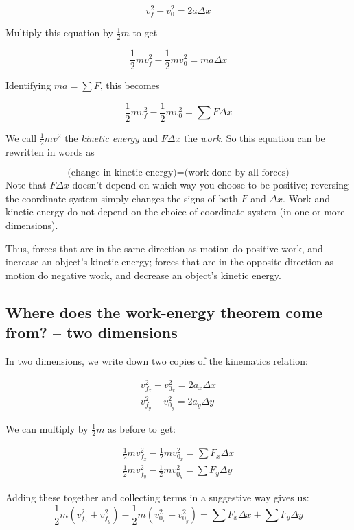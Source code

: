 \documentclass[10pt]{article}
\begin{document}
$$ v_f^2 - v_0^2 = 2a\Delta x$$

Multiply this equation by $\frac{1}{2}m$ to get

$$ \frac{1}{2}mv_f^2 - \frac{1}{2}mv_0^2 = ma \Delta x$$

Identifying $ma = \sum F$, this becomes

\begin{equation}
 \frac{1}{2}mv_f^2 - \frac{1}{2}mv_0^2 = \sum F \Delta x
 \end{equation}

We call $\frac{1}{2}mv^2$ the {\it kinetic energy} and $F \Delta x$ the {\it work}. So this equation can be rewritten in words as

\begin{equation}
\text{(change in kinetic energy)} = \text{(work done by all forces)}
\end{equation}
Note that $F \Delta x$ doesn't depend on which way you choose to be positive; reversing the coordinate system simply changes the signs of both $F$ and $\Delta x$. Work and kinetic energy do not depend on the choice of coordinate system (in one or more dimensions).

Thus, forces that are in the same direction as motion do positive work, and increase an object's kinetic energy; forces that are in the opposite direction as motion do negative work, and decrease an object's kinetic energy.


\subsection{Where does the work-energy theorem come from? -- two dimensions}


In two dimensions, we write down two copies of the kinematics relation:

\begin{align*}
v_{f_x}^2 - v_{0_x}^2 = 2a_x\Delta x \nonumber \\
v_{f_y}^2 - v_{0_y}^2 = 2a_y\Delta y 
\end{align*}

We can multiply by $\frac{1}{2}m$ as before to get:


\begin{align*}
\frac{1}{2}mv_{f_x}^2 - \frac{1}{2}mv_{0_x}^2 = \sum F_x \Delta x \nonumber \\
\frac{1}{2}mv_{f_y}^2 - \frac{1}{2}mv_{0_y}^2 = \sum F_y \Delta y 
\end{align*}


Adding these together and collecting terms in a suggestive way gives us:
$$
\frac{1}{2}m(v_{f_x}^2 + v_{f_y}^2)  - \frac{1}{2}m(v_{0_x}^2 + v_{0_y}^2)= \sum F_x \Delta x + \sum F_y \Delta y
$$
\end{document}
